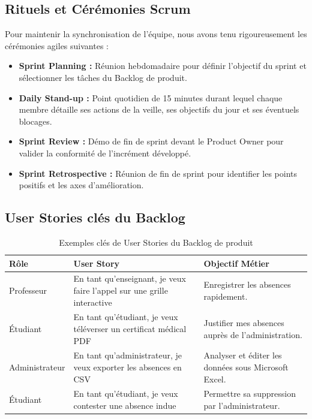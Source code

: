 \documentclass[12pt,a4paper]{article}
\begin{document}
\subsection{Rituels et Cérémonies Scrum}
Pour maintenir la synchronisation de l'équipe, nous avons tenu rigoureusement les cérémonies agiles suivantes :
\begin{itemize}
    \item \textbf{Sprint Planning :} Réunion hebdomadaire pour définir l'objectif du sprint et sélectionner les tâches du Backlog de produit.
    \item \textbf{Daily Stand-up :} Point quotidien de 15 minutes durant lequel chaque membre détaille ses actions de la veille, ses objectifs du jour et ses éventuels blocages.
    \item \textbf{Sprint Review :} Démo de fin de sprint devant le Product Owner pour valider la conformité de l'incrément développé.
    \item \textbf{Sprint Retrospective :} Réunion de fin de sprint pour identifier les points positifs et les axes d'amélioration.
\end{itemize}

\subsection{User Stories clés du Backlog}
\begin{table}[htbp]
    \centering
    \caption{Exemples clés de User Stories du Backlog de produit}
    \vspace{0.3cm}
    \begin{tabular}{lp{6cm}p{5cm}}
        \hline
        \textbf{Rôle} & \textbf{User Story} & \textbf{Objectif Métier} \\
        \hline
        Professeur & En tant qu'enseignant, je veux faire l'appel sur une grille interactive & Enregistrer les absences rapidement. \\
        Étudiant & En tant qu'étudiant, je veux téléverser un certificat médical PDF & Justifier mes absences auprès de l'administration. \\
        Administrateur & En tant qu'administrateur, je veux exporter les absences en CSV & Analyser et éditer les données sous Microsoft Excel. \\
        Étudiant & En tant qu'étudiant, je veux contester une absence indue & Permettre sa suppression par l'administrateur. \\
        \hline
    \end{tabular}
\end{table}
\end{document}
